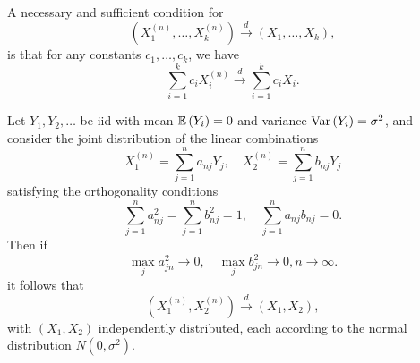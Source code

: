 \begin{theorem}
	\label{thm:convergence-in-distribution-by-linear-combinations}
	A necessary and sufficient condition for
	\begin{equation*}
		(X_{1}^{(n)},\ldots,X_k^{(n)})\stackrel{d}{\rightarrow}(X_{1},\ldots,X_k),
	\end{equation*}
	is that for any constants $c_{1},\ldots,c_k$, we have
	\begin{equation*}
		\sum_{i=1}^{k}c_{i}X_{i}^{(n)}\stackrel{d}{\rightarrow}\sum_{i=1}^{k}c_{i}X_{i}.
	\end{equation*}
\end{theorem}

\begin{example}
	Let $Y_{1},Y_{2},\ldots$ be iid with mean ${\mathbb E}\left(Y_{i}\right)=0$ and variance $\mathrm{Var}\left(Y_{i}\right)=\sigma^2$, and consider the joint distribution of the linear combinations
	\begin{equation*}
		X_{1}^{(n)}=\sum_{j=1}^{n}a_{nj}Y_{j},\quad X_{2}^{(n)}=\sum_{j=1}^{n}b_{nj}Y_{j}
	\end{equation*}
	satisfying the orthogonality conditions
	\begin{equation}
		\label{eq:orthogonality-conditions-2}
		\sum_{j=1}^{n}a_{nj}^{2}=\sum_{j=1}^{n}b_{nj}^2=1,\quad \sum_{j=1}^{n}a_{nj}b_{nj}=0.
	\end{equation}
	Then if
	\begin{equation*}
		\max_{j}a_{jn}^{2}\rightarrow 0,\quad\max_{j}b_{jn}^2\rightarrow 0,n \rightarrow \infty.
	\end{equation*}
	it follows that
	\begin{equation*}
		(X_{1}^{(n)},X_{2}^{(n)})\stackrel{d}{\rightarrow}(X_{1},X_{2}),
	\end{equation*}
	with $(X_{1},X_{2})$ independently distributed, each according to the normal distribution $N\left(0,\sigma^2\right)$.
\end{example}

